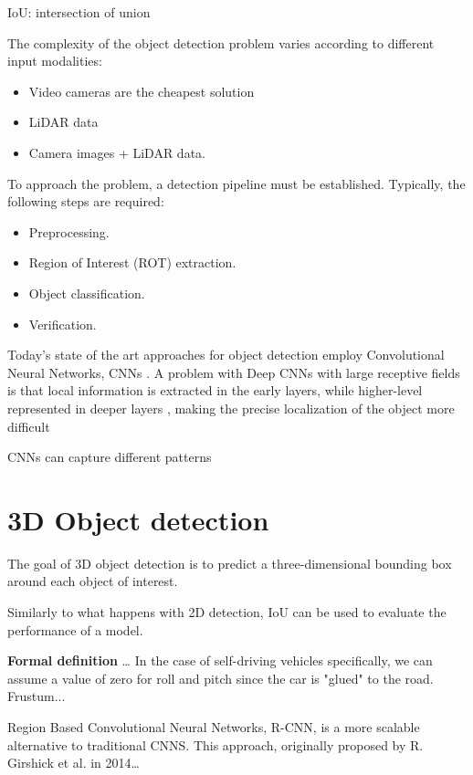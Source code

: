 IoU: intersection of union

The complexity of the object detection problem varies according to different input modalities:
\begin{itemize}
    \item Video cameras are the cheapest solution
    \item LiDAR data 
    \item Camera images + LiDAR data. 
\end{itemize}

To approach the problem, a detection pipeline must be established. Typically, the following steps are required:
\begin{itemize}
    \item Preprocessing.
    \item Region of Interest (ROT) extraction.
    \item Object classification.
    \item Verification.
\end{itemize}

Today's state of the art approaches for object detection employ Convolutional Neural Networks, CNNs \cite{DBLP:conf/eccv/CaiFFV16} \cite{DBLP:journals/pami/ChenKZMFU18}.
A problem with Deep CNNs with large receptive fields is that local information is extracted in the early layers, while higher-level represented in deeper layers \cite{DBLP:journals/ftcgv/JanaiGBG20}, making the precise localization of the object more difficult



CNNs can capture different patterns 


\newpage
\section{3D Object detection}
The goal of 3D object detection is to predict a three-dimensional bounding box around each object of interest.

Similarly to what happens with 2D detection, IoU can be used to evaluate the performance of a model.


\textbf{Formal definition}
\dots
In the case of self-driving vehicles specifically, we can assume a value of zero for roll and pitch since the car is "glued" to the road.
Frustum...





Region Based Convolutional Neural Networks, R-CNN, is a more scalable alternative to traditional CNNS. This approach, originally proposed by R. Girshick et al. \cite{DBLP:conf/cvpr/GirshickDDM14} in 2014\dots

